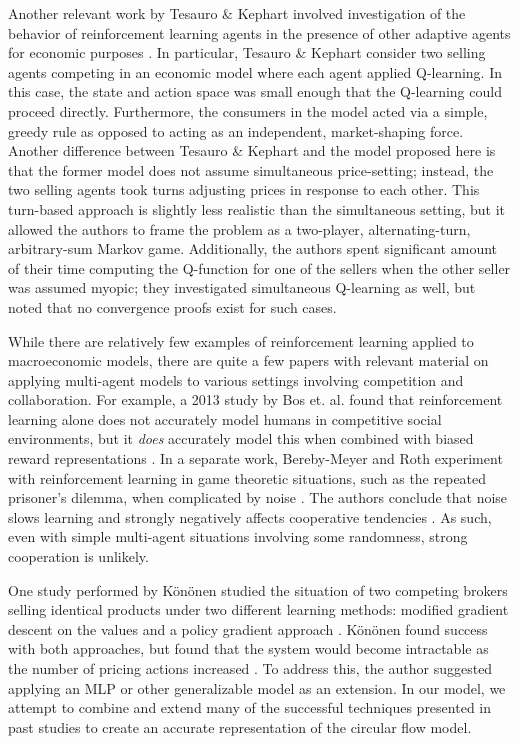 \documentclass[twoside,twocolumn]{article}
\begin{document}
Another relevant work by Tesauro \& Kephart involved investigation of the behavior of reinforcement learning agents in the presence of other adaptive agents for economic purposes \cite{pricing-multi-agent}. In particular, Tesauro \& Kephart consider two selling agents competing in an economic model where each agent applied Q-learning. In this case, the state and action space was small enough that the Q-learning could proceed directly. Furthermore, the consumers in the model acted via a simple, greedy rule as opposed to acting as an independent, market-shaping force. Another difference between Tesauro \& Kephart and the model proposed here is that the former model does not assume simultaneous price-setting; instead, the two selling agents took turns adjusting prices in response to each other. This turn-based approach is slightly less realistic than the simultaneous setting, but it allowed the authors to frame the problem as a two-player, alternating-turn, arbitrary-sum Markov game. Additionally, the authors spent significant amount of their time computing the Q-function for one of the sellers when the other seller was assumed myopic; they investigated simultaneous Q-learning as well, but noted that no convergence proofs exist for such cases.

\medskip 

While there are relatively few examples of reinforcement learning applied to macroeconomic models, there are quite a few papers with relevant material on applying multi-agent models to various settings involving competition and collaboration. For example, a 2013 study by Bos et. al. found that reinforcement learning alone does not accurately model humans in competitive social environments, but it \textit{does} accurately model this when combined with biased reward representations \cite{vandenBos2137}. In a separate work, Bereby-Meyer and Roth experiment with reinforcement learning in game theoretic situations, such as the repeated prisoner's dilemma, when complicated by noise \cite{10.1257/aer.96.4.1029}. The authors conclude that noise slows learning and strongly negatively affects cooperative tendencies \cite{10.1257/aer.96.4.1029}. As such, even with simple multi-agent situations involving some randomness, strong cooperation is unlikely.

\medskip

One study performed by K\"on\"onen studied the situation of two competing brokers selling identical products under two different learning methods: modified gradient descent on the values and a policy gradient approach \cite{doi:10.1002/int.20121}. K\"on\"onen found success with both approaches, but found that the system would become intractable as the number of pricing actions increased \cite{doi:10.1002/int.20121}. To address this, the author suggested applying an MLP or other generalizable model as an extension. In our model, we attempt to combine and extend many of the successful techniques presented in past studies to create an accurate representation of the circular flow model.   
\end{document}
